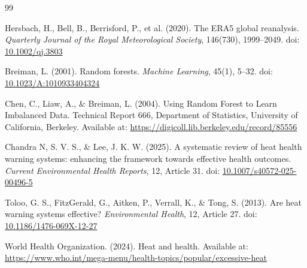 \documentclass[12pt,a4paper]{article}
\begin{document}
\begin{thebibliography}{99}

Hersbach, H., Bell, B., Berrisford, P., et al. (2020).
\newblock The ERA5 global reanalysis.
\newblock \emph{Quarterly Journal of the Royal Meteorological Society}, 146(730), 1999--2049.
\newblock doi: \href{https://doi.org/10.1002/qj.3803}{10.1002/qj.3803}

Breiman, L. (2001).
\newblock Random forests.
\newblock \emph{Machine Learning}, 45(1), 5--32.
\newblock doi: \href{https://doi.org/10.1023/A:1010933404324}{10.1023/A:1010933404324}

Chen, C., Liaw, A., \& Breiman, L. (2004).
\newblock Using Random Forest to Learn Imbalanced Data.
\newblock Technical Report 666, Department of Statistics, University of California, Berkeley.
\newblock Available at: \url{https://digicoll.lib.berkeley.edu/record/85556}

Chandra N, S. V. S., \& Lee, J. K. W. (2025).
\newblock A systematic review of heat health warning systems: enhancing the framework towards effective health outcomes.
\newblock \emph{Current Environmental Health Reports}, 12, Article 31.
\newblock doi: \href{https://doi.org/10.1007/s40572-025-00496-5}{10.1007/s40572-025-00496-5}

Toloo, G. S., FitzGerald, G., Aitken, P., Verrall, K., \& Tong, S. (2013).
\newblock Are heat warning systems effective?
\newblock \emph{Environmental Health}, 12, Article 27.
\newblock doi: \href{https://doi.org/10.1186/1476-069X-12-27}{10.1186/1476-069X-12-27}

World Health Organization. (2024).
\newblock Heat and health.
\newblock Available at: \url{https://www.who.int/mega-menu/health-topics/popular/excessive-heat}

\end{thebibliography}
\end{document}
